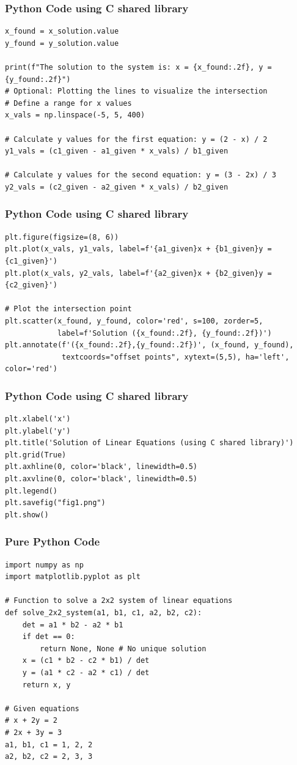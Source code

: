 \documentclass{beamer}
\begin{document}
\begin{frame}[fragile]
\frametitle{Python Code using C shared library}
\begin{lstlisting}
x_found = x_solution.value
y_found = y_solution.value

print(f"The solution to the system is: x = {x_found:.2f}, y = {y_found:.2f}")
# Optional: Plotting the lines to visualize the intersection
# Define a range for x values
x_vals = np.linspace(-5, 5, 400)

# Calculate y values for the first equation: y = (2 - x) / 2
y1_vals = (c1_given - a1_given * x_vals) / b1_given

# Calculate y values for the second equation: y = (3 - 2x) / 3
y2_vals = (c2_given - a2_given * x_vals) / b2_given
\end{lstlisting}
\end{frame}

\begin{frame}[fragile]
\frametitle{Python Code using C shared library}
\begin{lstlisting}
plt.figure(figsize=(8, 6))
plt.plot(x_vals, y1_vals, label=f'{a1_given}x + {b1_given}y = {c1_given}')
plt.plot(x_vals, y2_vals, label=f'{a2_given}x + {b2_given}y = {c2_given}')

# Plot the intersection point
plt.scatter(x_found, y_found, color='red', s=100, zorder=5, 
            label=f'Solution ({x_found:.2f}, {y_found:.2f})')
plt.annotate(f'({x_found:.2f},{y_found:.2f})', (x_found, y_found), 
             textcoords="offset points", xytext=(5,5), ha='left', color='red')
\end{lstlisting}
\end{frame}

\begin{frame}[fragile]
\frametitle{Python Code using C shared library}
\begin{lstlisting}
plt.xlabel('x')
plt.ylabel('y')
plt.title('Solution of Linear Equations (using C shared library)')
plt.grid(True)
plt.axhline(0, color='black', linewidth=0.5)
plt.axvline(0, color='black', linewidth=0.5)
plt.legend()
plt.savefig("fig1.png")
plt.show()
\end{lstlisting}
\end{frame}

\begin{frame}[fragile]
\frametitle{Pure Python Code}
\begin{lstlisting}
import numpy as np
import matplotlib.pyplot as plt

# Function to solve a 2x2 system of linear equations
def solve_2x2_system(a1, b1, c1, a2, b2, c2):
    det = a1 * b2 - a2 * b1
    if det == 0:
        return None, None # No unique solution
    x = (c1 * b2 - c2 * b1) / det
    y = (a1 * c2 - a2 * c1) / det
    return x, y

# Given equations
# x + 2y = 2
# 2x + 3y = 3
a1, b1, c1 = 1, 2, 2
a2, b2, c2 = 2, 3, 3
\end{lstlisting}
\end{frame}
\end{document}
